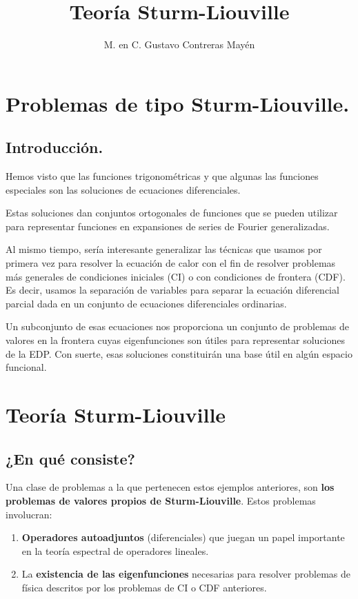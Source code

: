 \documentclass[12pt]{article}
\title{\large{Teoría Sturm-Liouville}}
\author{M. en C. Gustavo Contreras Mayén}
\date{}
\numberwithin{equation}{section}
\begin{document}
\vspace{-4cm}
\maketitle
\fontsize{14}{14}\selectfont
\tableofcontents
\newpage

\section{Problemas de tipo Sturm-Liouville.}
\subsection{Introducción.}

Hemos visto que las funciones trigonométricas y que algunas las funciones especiales son las soluciones de ecuaciones diferenciales.
\par
Estas soluciones dan conjuntos ortogonales de funciones que se pueden utilizar para representar funciones en expansiones de series de Fourier generalizadas.
\par
Al mismo tiempo, sería interesante generalizar las técnicas que usamos por primera vez para resolver la ecuación de calor con el fin de resolver problemas más generales de condiciones iniciales (CI) o con condiciones de frontera (CDF). Es decir, usamos la separación de variables para separar la ecuación diferencial parcial dada en un conjunto de ecuaciones diferenciales ordinarias.
\par
Un subconjunto de esas ecuaciones nos proporciona un conjunto de problemas de valores en la frontera cuyas eigenfunciones son útiles para representar soluciones de la EDP. Con suerte, esas soluciones constituirán una base útil en algún espacio funcional.

\section{Teoría Sturm-Liouville}
\subsection{¿En qué consiste?}

Una clase de problemas a la que pertenecen estos ejemplos anteriores, son \textbf{los problemas de valores propios de Sturm-Liouville}. Estos problemas involucran:
\begin{enumerate}
\item \textbf{Operadores autoadjuntos} (diferenciales) que juegan un papel importante en la teoría espectral de operadores lineales.
\item La \textbf{existencia de las eigenfunciones} necesarias para resolver problemas de física descritos por los problemas de CI o CDF anteriores.
\end{enumerate}
\end{document}
